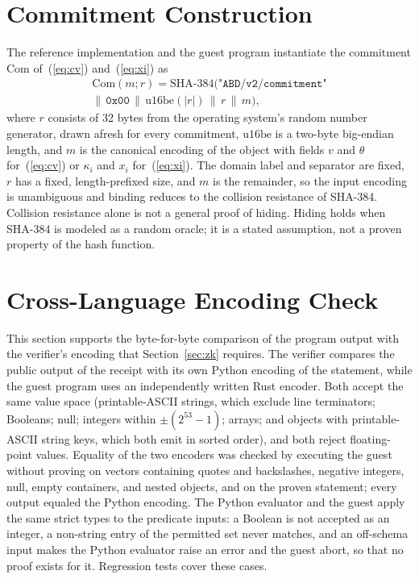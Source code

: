\documentclass[journal]{IEEEtran}
\newcommand{\Com}{\mathrm{Com}}
\begin{document}
\section{Commitment Construction}
\label{s:zkcommit}
The reference implementation and the guest program instantiate the commitment $\Com$ of~(\ref{eq:cv}) and~(\ref{eq:xi}) as
\begin{multline*}
\Com(m; r) = \mathrm{SHA\text{-}384}(\texttt{"ABD/v2/commitment"}\\
\|\, \texttt{0x00} \,\|\, \mathrm{u16be}(|r|) \,\|\, r \,\|\, m),
\end{multline*}
where $r$ consists of 32 bytes from the operating system's random number generator, drawn afresh for every commitment, $\mathrm{u16be}$ is a two-byte big-endian length, and $m$ is the canonical encoding of the object with fields $v$ and $\theta$ for~(\ref{eq:cv}) or $\kappa_i$ and $x_i$ for~(\ref{eq:xi}). The domain label and separator are fixed, $r$ has a fixed, length-prefixed size, and $m$ is the remainder, so the input encoding is unambiguous and binding reduces to the collision resistance of SHA-384. Collision resistance alone is not a general proof of hiding. Hiding holds when SHA-384 is modeled as a random oracle; it is a stated assumption, not a proven property of the hash function.

\section{Cross-Language Encoding Check}
\label{s:zkencoding}
This section supports the byte-for-byte comparison of the program output with the verifier's encoding that Section~\ref{sec:zk} requires. The verifier compares the public output of the receipt with its own Python encoding of the statement, while the guest program uses an independently written Rust encoder. Both accept the same value space (printable-ASCII strings, which exclude line terminators; Booleans; null; integers within $\pm(2^{53}-1)$; arrays; and objects with printable-ASCII string keys, which both emit in sorted order), and both reject floating-point values. Equality of the two encoders was checked by executing the guest without proving on vectors containing quotes and backslashes, negative integers, null, empty containers, and nested objects, and on the proven statement; every output equaled the Python encoding. The Python evaluator and the guest apply the same strict types to the predicate inputs: a Boolean is not accepted as an integer, a non-string entry of the permitted set never matches, and an off-schema input makes the Python evaluator raise an error and the guest abort, so that no proof exists for it. Regression tests cover these cases.
\end{document}
